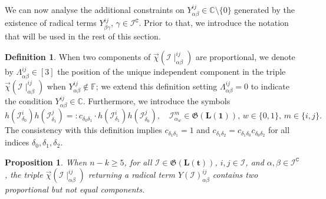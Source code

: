 \documentclass[10pt]{article}
\newtheorem{prop}{Proposition}%
\theoremstyle{remark}%
\theoremstyle{definition}%
\newtheorem{defn}{Definition}%
\begin{document}
We can now analyse the additional constraints on $Y_{\alpha\beta}^{ij}\in\mathbb{C}\setminus\{0\}$ generated by the existence of radical terms $Y_{\beta\gamma}^{ij}$, $\gamma \in \mathcal{I}^{\mathtt{C}}$. Prior to that, we introduce the notation that will be used in the rest of this section. 
\begin{defn}
\label{def: proportionality position and symbols}
When two components of $\overrightarrow{\chi}(\mathcal{I}\mid_{\alpha\beta}^{ij})$ are proportional, we denote by $\Lambda_{\alpha\beta}^{ij}\in[3]$ the position of the unique independent component in the triple $\overrightarrow{\chi}(\mathcal{I}\mid_{\alpha\beta}^{ij})$ when $Y_{\alpha\beta}^{ij}\notin\mathbb{F}$; we extend this definition setting $\Lambda_{\alpha\beta}^{ij}=0$ to indicate the condition $Y_{\alpha\beta}^{ij}\in\mathbb{C}$. Furthermore, we introduce the symbols
\begin{equation}
 h(\mathcal{I}_{\delta_{0}}^{i})h(\mathcal{I}_{\delta_{1}}^{j})=:c_{\delta_{0}\delta_{1}}\cdot h(\mathcal{I}_{\delta_{1}}^{i})h(\mathcal{I}_{\delta_{0}}^{j}),\quad \mathcal{I}_{\alpha_{w}}^{m}\in\mathfrak{G}(\mathbf{L}(\mathbf{1})),\,w\in\{0,1\},\,m\in\{i,j\}.
\label{eq: associativity for common positions}
\end{equation}
The consistency with this definition implies $c_{\delta_{1}\delta_{1}}=1$ and $c_{\delta_{1}\delta_{2}}=c_{\delta_{1}\delta_{0}}c_{\delta_{0}\delta_{2}}$ for all indices $\delta_{0},\delta_{1},\delta_{2}$. 
\end{defn}
\begin{prop}
\label{prop: existence proportional but non-equal terms} 
When $n-k\geq5$, for all $\mathcal{I}\in\mathfrak{G}(\mathbf{L}(\mathbf{t}))$, $i,j\in\mathcal{I}$, and $\alpha,\beta\in\mathcal{I}^{\mathtt{C}}$, the triple  $\overrightarrow{\chi}(\mathcal{I}\mid_{\alpha\beta}^{ij})$ returning a radical term $Y(\mathcal{I})_{\alpha\beta}^{ij}$ contains two proportional but not equal components. 
\end{prop}
\end{document}
